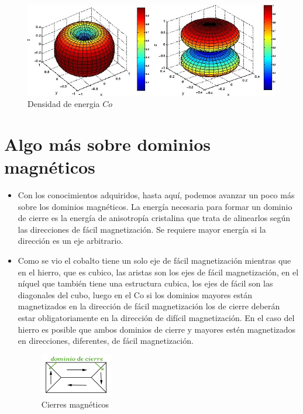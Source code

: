 \begin{figure}[H]
    \centering
    \includegraphics[width=1.0\textwidth]{./Figures/densidadEnergia2}
	\caption{Densidad de energia $Co$}
	\label{fig:densidadEnergia2}
\end{figure}


\section{Algo más sobre dominios magnéticos}

\begin{itemize}
	\item Con los conocimientos adquiridos, hasta aquí, podemos avanzar un poco más sobre los dominios
magnéticos. La energía necesaria para formar un dominio de cierre es la energía de anisotropía
cristalina que trata de alinearlos según las direcciones de fácil magnetización. Se requiere mayor energía si la dirección es un eje arbitrario.

	\item Como se vio el cobalto tiene un solo eje de fácil magnetización mientras que en el hierro, que es cubico, las aristas son los ejes de fácil magnetización, en el níquel que también tiene una estructura cubica, los ejes de fácil son las diagonales del cubo, luego en el Co si los dominios mayores están magnetizados en la dirección de fácil magnetización los de cierre deberán estar obligatoriamente en la dirección de difícil magnetización. En el caso del hierro es posible que ambos dominios de cierre y mayores estén magnetizados en direcciones, diferentes, de fácil magnetización.
	
	\begin{figure}[H]
    \centering
    \includegraphics[width=0.3\textwidth]{./Figures/cierre}
	\caption{Cierres magnéticos}
	\label{fig:cierre}
	\end{figure}

\end{itemize}


